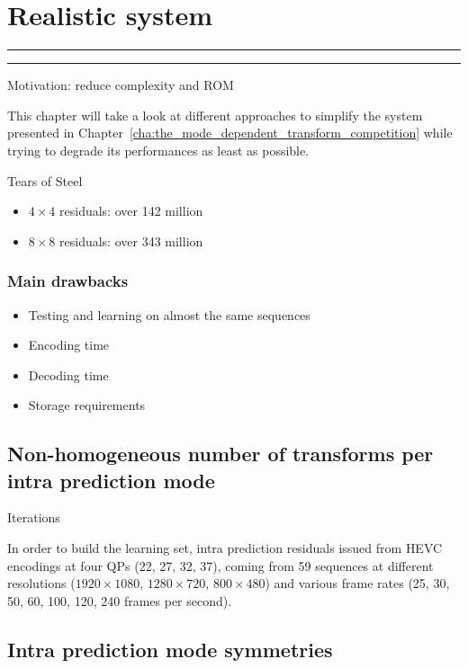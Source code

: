 \documentclass[11pt,a4paper,openright,twoside]{book}
\providecommand{\chaptertoc}{
	\startcontents[chapters]
	\hrule
	\vspace{1em}
	\printcontents[chapters]{}{1}{{\bf\large Contents}}
	\hrule
}
\numberwithin{equation}{section} %
\numberwithin{figure}{section} %
\numberwithin{table}{section} %
\begin{document}
\chapter{Realistic system}
\label{cha:realistic_system}
\chaptertoc

Motivation: reduce complexity and ROM

This chapter will take a look at different approaches to simplify the
system presented in
Chapter~\ref{cha:the_mode_dependent_transform_competition} while trying
to degrade its performances as least as possible.

Tears of Steel
\begin{itemize}
	\item $4\times4$ residuals: over 142 million
	\item $8\times8$ residuals: over 343 million
\end{itemize}

\subsection{Main drawbacks}
\label{sub:main_drawbacks}

\begin{itemize}
	\item Testing and learning on almost the same sequences
	\item Encoding time
	\item Decoding time
	\item Storage requirements
\end{itemize}

\section{Non-homogeneous number of transforms per intra prediction mode}
\label{sec:non_homogeneous_number_of_transforms_per_intra_prediction_mode}

Iterations

In order to build the learning set, intra prediction residuals issued from
\ac{HEVC} encodings at four \acp{QP} (22, 27, 32, 37), coming from 59
sequences at different resolutions ($1920\times1080$, $1280\times720$,
$800\times480$) and various frame rates (25, 30, 50, 60, 100, 120, 240
frames per second).

\section{Intra prediction mode symmetries}
\label{sec:intra_prediction_mode_symmetries}
\end{document}

